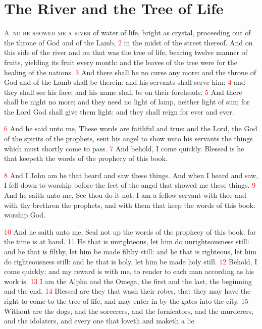 \documentclass[12pt,twoside]{memoir}
\newcommand{\vnum}[1]{\textcolor{red}{\normalsize{#1}}}
\begin{document}

\chapter{The River and the Tree of Life}
\lettrine[lines=3,slope=-0.5em]{\textcolor{red}{A}}{\ nd he showed me a river} of water of life, bright as crystal, proceeding out of the throne of God and of the Lamb, 
\vnum{2} in the midst of the street thereof. And on this side of the river and on that was the tree of life, bearing twelve manner of fruits, yielding its fruit every month: and the leaves of the tree were for the healing of the nations. 
\vnum{3} And there shall be no curse any more: and the throne of God and of the Lamb shall be therein: and his servants shall serve him; 
\vnum{4} and they shall see his face; and his name shall be on their foreheads. 
\vnum{5} And there shall be night no more; and they need no light of lamp, neither light of sun; for the Lord God shall give them light: and they shall reign for ever and ever.

\vnum{6} And he said unto me, These words are faithful and true: and the Lord, the God of the spirits of the prophets, sent his angel to show unto his servants the things which must shortly come to pass. 
\vnum{7} And behold, I come quickly. Blessed is he that keepeth the words of the prophecy of this book.

\vnum{8} And I John am he that heard and saw these things. And when I heard and saw, I fell down to worship before the feet of the angel that showed me these things. 
\vnum{9} And he saith unto me, See thou do it not: I am a fellow-servant with thee and with thy brethren the prophets, and with them that keep the words of this book: worship God.

\vnum{10} And he saith unto me, Seal not up the words of the prophecy of this book; for the time is at hand. 
\vnum{11} He that is unrighteous, let him do unrighteousness still: and he that is filthy, let him be made filthy still: and he that is righteous, let him do righteousness still: and he that is holy, let him be made holy still. 
\vnum{12} Behold, I come quickly; and my reward is with me, to render to each man according as his work is. 
\vnum{13} I am the Alpha and the Omega, the first and the last, the beginning and the end. 
\vnum{14} Blessed are they that wash their robes, that they may have the right to come to the tree of life, and may enter in by the gates into the city. 
\vnum{15} Without are the dogs, and the sorcerers, and the fornicators, and the murderers, and the idolaters, and every one that loveth and maketh a lie.
\end{document}
